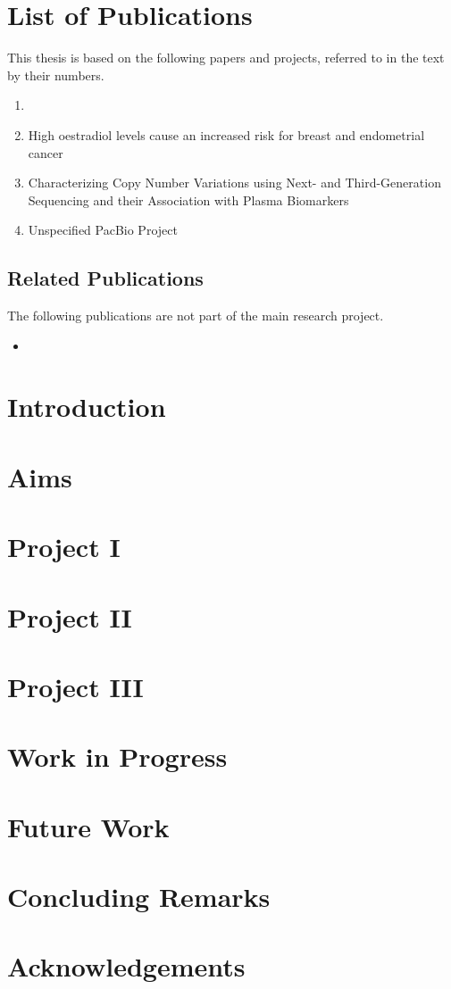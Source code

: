 \documentclass[]{scrbook}
\begin{document}
\chapter{List of Publications}
This thesis is based on the following papers and projects, referred to in the text by their numbers.

\begin{enumerate}[label=\Roman*.]
    \item {}
    \item High oestradiol levels cause an increased risk for breast and endometrial cancer
    \item Characterizing Copy Number Variations using Next- and Third-Generation Sequencing and their Association with Plasma Biomarkers
    \item Unspecified PacBio Project
\end{enumerate}

\section*{Related Publications}
The following publications are not part of the main research project.
\begin{itemize}
    \item {}
\end{itemize}
\tableofcontents


\mainmatter

\chapter{Introduction}

\chapter{Aims}

\chapter{Project I}

\chapter{Project II}

\chapter{Project III}

\chapter{Work in Progress}

\chapter{Future Work}

\chapter{Concluding Remarks}


\backmatter

\chapter{Acknowledgements}
\printbibliography
\end{document}
